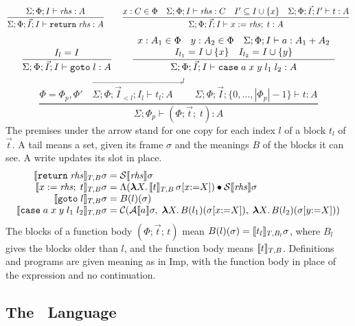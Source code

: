 {\small\figdefs
{}
\[
  \dfrac{\Sigma; \Phi; I \vdash \mathit{rhs} : A}{\Sigma; \Phi; \vec{I}; I \vdash \mathtt{return}\;\mathit{rhs} : A}
  \qquad
  \dfrac{x : C \in \Phi \quad \Sigma; \Phi; I \vdash \mathit{rhs} : C \quad I' \subseteq I \cup \{x\} \quad
         \Sigma; \Phi; \vec{I}; I' \vdash t : A}
        {\Sigma; \Phi; \vec{I}; I \vdash x \mathrel{:=} \mathit{rhs};\; t : A}
\]
\[
  \dfrac{I_l = I}{\Sigma; \Phi; \vec{I}; I \vdash \mathtt{goto}\;l : A}
  \qquad
  \dfrac{\begin{array}{c}
           x : A_1 \in \Phi \quad y : A_2 \in \Phi \quad
           \Sigma; \Phi; I \vdash a : A_1 + A_2\\
           I_{l_1} = I \cup \{x\} \quad I_{l_2} = I \cup \{y\}
         \end{array}}
        {\Sigma; \Phi; \vec{I}; I \vdash
         \mathtt{case}\;a\;x\;y\;l_1\;l_2 : A}
\]
\[
  \dfrac{\Phi = \Phi_p, \Phi' \quad
         \overrightarrow{\Sigma; \Phi; \vec{I}_{<l}; I_l \vdash t_l : A \quad}^{l}
         \quad \Sigma; \Phi; \vec{I}; \{0, \ldots, |\Phi_p| - 1\} \vdash t : A}
        {\Sigma; \Phi_p \vdash (\Phi; \vec{t};\; t) : A}
\]
}
The premises under the arrow stand for one copy for each index $l$ of a
block $t_l$ of $\vec{t}$.
A tail means a set, given its frame $\sigma$ and the
meanings $B$ of the blocks it can see. A write updates its slot in
place.
{\small\figdefs
{}
\[
\begin{array}{@{}r@{\;}c@{\;}l@{}}
  \den{\kw{return}\;\rhs}_{T,B}\sigma & = & \mathcal{S}\den{\rhs}\sigma\\
  \den{x \mathrel{:=} \rhs;\; t}_{T,B}\sigma & = &
    \Lambda(\mlam{X} \den{t}_{T,B}\,\sigma[x{:=}X]) \app \mathcal{S}\den{\rhs}\sigma\\
  \den{\kw{goto}\;l}_{T,B}\sigma & = & B(l)(\sigma)\\
  \den{\kw{case}\;a\;x\;y\;l_1\;l_2}_{T,B}\sigma & = &
    \mathcal{C}(\mathcal{A}\den{a}\sigma,\;
      \mlam{X} B(l_1)(\sigma[x{:=}X]),\;
      \mlam{X} B(l_2)(\sigma[y{:=}X]))
\end{array}
\]
}
The blocks of a function body $(\Phi; \vec{t};\, t)$ mean
$B(l)(\sigma) = \llbracket t_l \rrbracket_{T,B_l}\sigma$, where $B_l$ gives the blocks
older than $l$, and the function body means $\llbracket t \rrbracket_{T,B}$. Definitions and
programs are given meaning as in Imp, with the function body in place of the
expression and no continuation.

\subsection{The \instr\ Language}
\label{app:instr}

